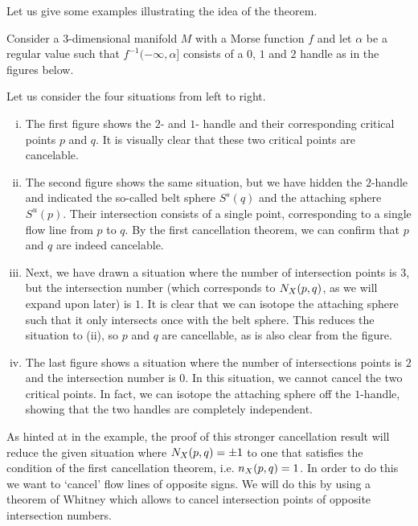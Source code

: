 Let us give some examples illustrating the idea of the theorem.
\begin{eg}
    Consider a $3$-dimensional manifold $M$ with a Morse function $f$ and let $\alpha$ be a regular value such that  $f^{-1}(-\infty, \alpha]$ consists of a $0$, $1$ and  $2$ handle as in the figures below.
    \begin{figure}[H]
    \centering
\end{figure}
    Let us consider the four situations from left to right.
    \begin{enumerate}[(i)]
        \item The first figure shows the $2$- and  $1$- handle and their corresponding critical points $p$ and  $q$.
            It is visually clear that these two critical points are cancelable.
        \item The second figure shows the same situation, but we have hidden the $2$-handle and indicated the so-called belt sphere $S^{s}(q)$ and the attaching sphere $S^{u}(p)$. Their intersection consists of a single point, corresponding to a single flow line from $p$ to $q$. 
            By the first cancellation theorem, we can confirm that $p$ and  $q$ are indeed cancelable.
        \item Next, we have drawn a situation where the number of intersection points is $3$, but the intersection number (which corresponds to $N_{X}(p, q)$, as we will expand upon later) is $1$. It is clear that we can isotope the attaching sphere such that it only intersects once with the belt sphere.
            This reduces the situation to (ii), so $p$ and  $q$ are cancellable, as is also clear from the figure. 
        \item The last figure shows a situation where the number of intersections points is $2$ and the intersection number is $0$. In this situation, we cannot cancel the two critical points. In fact, we can isotope the attaching sphere off the $1$-handle, showing that the two handles are completely independent.
    \end{enumerate}
\end{eg}
As hinted at in the example, the proof of this stronger cancellation result will reduce the given situation where $N_{X}(p, q) = \pm 1$ to one that satisfies the condition of the first cancellation theorem, i.e. $n_{X}(p, q) = 1$.
In order to do this we want to `cancel' flow lines of opposite signs.
We will do this by using a theorem of Whitney which allows to cancel intersection points of opposite intersection numbers.

